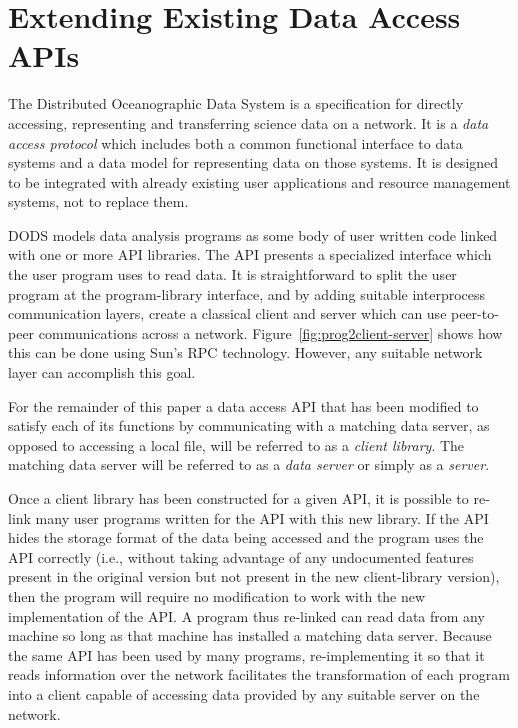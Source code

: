 \section {Extending Existing Data Access APIs}

The Distributed Oceanographic Data System is a specification for directly
accessing, representing and transferring science data on a network. It is a
{\em data access protocol\/} which includes both a common functional interface
to data systems and a data model for representing data on those systems.  It
is designed to be integrated with already existing user applications and
resource management systems, not to replace them.

DODS models data analysis programs as some body of user written code linked
with one or more API libraries. The API presents a specialized interface
which the user program uses to read data. It is straightforward to split the
user program at the program-library interface, and by adding suitable
interprocess communication layers, create a classical client and server which
can use peer-to-peer communications across a
network. Figure~\ref{fig:prog2client-server} shows how this can be done using
Sun's RPC technology\cite{sun:rpc}. However, any suitable network layer can
accomplish this goal\cite{stevens:unp}.

For the remainder of this paper a data access API that has been modified to
satisfy each of its functions by communicating with a matching data server,
as opposed to accessing a local file, will be referred to as a {\em client
library\/}. The matching data server will be referred to as a {\em data
server\/} or simply as a {\em server\/}.

Once a client library has been constructed for a given API, it is possible to
re-link many user programs written for the API with this new library. If the
API hides the storage format of the data being accessed and the program uses
the API correctly (i.e., without taking advantage of any undocumented
features present in the original version but not present in the new
client-library version), then the program will require no modification to
work with the new implementation of the API. A program thus re-linked can
read data from any machine so long as that machine has installed a matching
data server. Because the same API has been used by many programs,
re-implementing it so that it reads information over the network facilitates
the transformation of each program into a client capable of accessing data
provided by any suitable server on the network.


